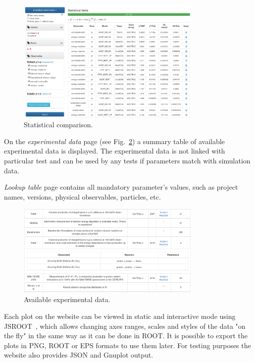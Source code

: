 \begin{figure}[h]
    \centering
    \includegraphics[width=0.8\textwidth,clip]{statcomparison.png}
    \caption{Statistical comparison.}
    \label{fig:statcomparison}
\end{figure}

On the \textit{experimental data} page (see Fig.~\ref{fig:exppage}) a summary table of available experimental data is displayed. The experimental data is not linked with particular test and can be used by any tests if parameters match with simulation data.

\textit{Lookup table} page contains all mandatory parameter's values, such as project names, versions, physical observables, particles, etc.

\begin{figure}[h]
    \centering
    \includegraphics[width=0.8\textwidth,clip]{expdata.png}
    \caption{Available experimental data.}
    \label{fig:exppage}
\end{figure}

Each plot on the website can be viewed in static and interactive mode using JSROOT~\cite{JSROOT}, which allows changing axes ranges, scales and styles of the data "on the fly" in the same way as it can be done in ROOT. It is possible to export the plots in PNG, ROOT or EPS formats to use them later. For testing purposes the website also provides JSON and Gnuplot output.


